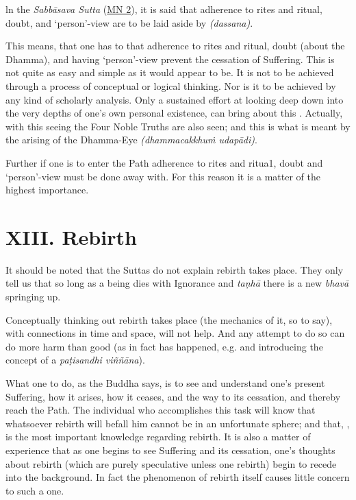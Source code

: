 ln the \emph{Sabbāsava Sutta} (\href{https://suttacentral.net/mn2/en/bodhi}{MN 2}), it is said that adherence to rites and ritual, doubt, and `person'-view are to be laid aside by  \emph{(dassana)}.

This means, that one has to  that adherence to rites and ritual, doubt (about the Dhamma), and having `person'-view prevent the cessation of Suffering. This  is not quite as easy and simple as it would appear to be. It is not to be achieved through a process of conceptual or logical thinking. Nor is it to be achieved by any kind of scholarly analysis. Only a sustained effort at looking deep down into the very depths of one's own personal existence, can bring about this . Actually, with this seeing the Four Noble Truths are also seen; and this is what is meant by the arising of the Dhamma-Eye \emph{(dhammacakkhuṁ udapādi)}.

Further if one is to enter the Path adherence to rites and ritua1, doubt and `person'-view must be done away with. For this reason it is a matter of the highest importance.

\hypertarget{_xiii_rebirth}{%
\section{XIII. Rebirth}\label{_xiii_rebirth}}

It should be noted that the Suttas do not explain  rebirth takes place. They only tell us that so long as a being dies with Ignorance and \emph{taṇhā} there is a new \emph{bhavā} springing up.

Conceptually thinking out  rebirth takes place (the mechanics of it, so to say), with connections in time and space, will not help. And any attempt to do so can do more harm than good (as in fact has happened, e.g.  and introducing the concept of a \emph{paṭisandhi viññāna}).

What one  to do, as the Buddha says, is to see and understand one's present Suffering, how it arises, how it ceases, and the way to its cessation, and thereby reach the Path. The individual who accomplishes this task will know that whatsoever rebirth will befall him cannot be in an unfortunate sphere; and that, , is the most important knowledge regarding rebirth. It is also a matter of experience that as one begins to see Suffering and its cessation, one's thoughts about rebirth (which are purely speculative unless one  rebirth) begin to recede into the background. In fact the phenomenon of rebirth itself causes little concern to such a one.

